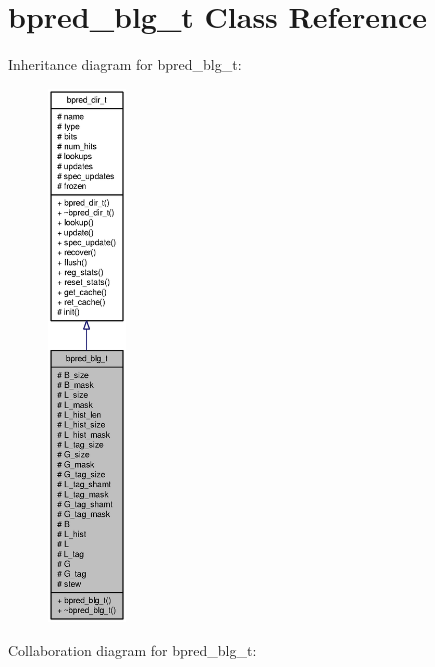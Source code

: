 \section{bpred\_\-blg\_\-t Class Reference}
\label{classbpred__blg__t}
Inheritance diagram for bpred\_\-blg\_\-t:\nopagebreak
\begin{figure}[H]
\begin{center}
\leavevmode
\includegraphics[height=400pt]{classbpred__blg__t__inherit__graph}
\end{center}
\end{figure}
Collaboration diagram for bpred\_\-blg\_\-t:\nopagebreak
